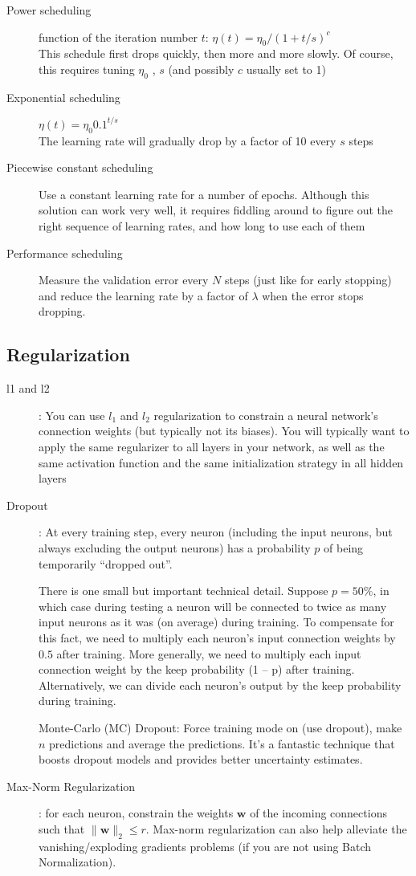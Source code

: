 \documentclass[french]{article}
\begin{document}
\begin{description}
    \item[Power scheduling] function of the iteration number $t$: $\eta(t) = \eta_0 / (1+ t/s)^c$ \\
      This schedule first drops quickly, then more and more slowly. Of course, this requires tuning $\eta_0$ , $s$ (and possibly $c$ usually set to 1)
    \item[Exponential scheduling] $\eta(t) = \eta_0 0.1^{t/s}$ \\
    The learning rate will gradually drop by a factor of 10 every $s$ steps
    \item[Piecewise constant scheduling] Use a constant learning rate for a number of epochs. Although this solution can work very well, it requires fiddling around to figure out the right sequence of learning rates, and how long to use each of them
    \item[Performance scheduling] Measure the validation error every $N$ steps (just like for early stopping) and reduce the learning rate by a factor of $\lambda$ when the error stops dropping.
\end{description}

\subsection{Regularization}

\begin{description}
    \item[l1 and l2]: You can use $l_1$ and $l_2$ regularization to constrain a neural network’s connection weights (but typically not its biases). You will typically want to apply the same regularizer to all layers in your network, as well as the same activation function and the same initialization strategy in all hidden layers
    \item[Dropout]: At every training step, every neuron (including the input neurons, but always excluding the output neurons) has a probability $p$ of being temporarily “dropped out”.

There is one small but important technical detail. Suppose $p = 50\%$, in which case during testing a neuron will be connected to twice as many input neurons as it was (on average) during training. To compensate for this fact, we need to multiply each neuron’s input connection weights by $0.5$ after training. More generally, we need to multiply each input connection weight by the keep probability (1 – p) after training. Alternatively, we can divide each neuron’s output by the keep probability during training.

    Monte-Carlo (MC) Dropout: Force training mode on (use dropout), make $n$ predictions and average the predictions. It's a fantastic technique that boosts dropout models and provides better uncertainty estimates.
    \item[Max-Norm Regularization]: for each neuron, constrain the weights $\bm{w}$ of the incoming connections such that $\|\bm{w}\|_2 \leq r$. Max-norm regularization can also help alleviate the vanishing/exploding gradients problems (if you are not using Batch Normalization).
\end{description}
\end{document}
